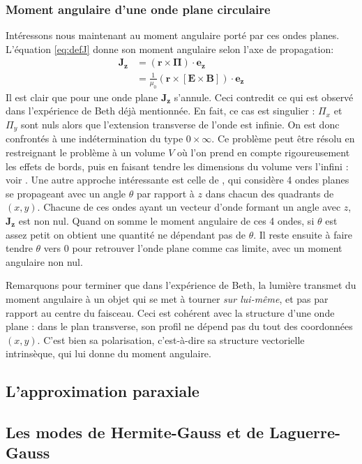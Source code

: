 \subsubsection{Moment angulaire d'une onde plane circulaire}
Intéressons nous maintenant au moment angulaire porté par ces ondes planes. L'équation \ref{eq:defJ} donne son moment angulaire selon l'axe de propagation: 
\begin{align*}
\bm{J_z}&=(\bm{r}\times\bm{\Pi})\cdot\bm{e_z}\\
&=\frac{1}{\mu_0}(\bm{r}\times[\bm{E}\times\bm{B}])\cdot\bm{e_z}
\end{align*}
Il est clair que pour une onde plane $\bm{J_z}$ s'annule. Ceci contredit ce qui est observé dans l'expérience de Beth  déjà mentionnée. En fait, ce cas est singulier : $\Pi_x$ et $\Pi_y $ sont nuls alors que l'extension transverse de l'onde est infinie. On est donc confrontés à une indétermination du type $0\times \infty$. 
Ce problème peut être résolu en restreignant le problème à un volume $V$ où l'on prend en compte rigoureusement les effets de bords, puis en faisant tendre les dimensions du volume vers l'infini : voir . Une autre approche intéressante est celle de , qui considère 4 ondes planes se propageant avec un angle $\theta$ par rapport à $z$ dans chacun des quadrants de $(x,y)$. Chacune de ces ondes ayant un vecteur d'onde formant un angle avec $z$, $\bm{J_z}$ est non nul. Quand on somme le moment angulaire de ces 4 ondes, si $\theta$ est assez petit on obtient une quantité ne dépendant pas de $\theta$. Il reste ensuite à faire tendre $\theta$ vers 0 pour retrouver l'onde plane comme cas limite, avec un moment angulaire non nul.

Remarquons pour terminer que dans l'expérience de Beth, la lumière transmet du moment angulaire à un objet qui se met à tourner \textit{sur lui-même}, et pas par rapport au centre du faisceau. Ceci est cohérent avec la structure d'une onde plane : dans le plan transverse, son profil ne dépend pas du tout des coordonnées $(x,y)$. C'est bien sa polarisation, c'est-à-dire sa structure vectorielle intrinsèque, qui lui donne du moment angulaire. 

\subsection{L'approximation paraxiale}


\subsection{Les modes de Hermite-Gauss et de Laguerre-Gauss}


